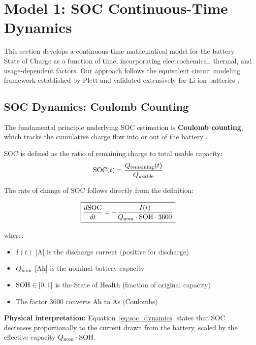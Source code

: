 \section{Model 1: SOC Continuous-Time Dynamics}
\label{sec:model1}

This section develops a continuous-time mathematical model for the battery State of Charge as a function of time, incorporating electrochemical, thermal, and usage-dependent factors. Our approach follows the equivalent circuit modeling framework established by Plett \cite{Plett2015} and validated extensively for Li-ion batteries \cite{Hu2012, Chen2006}.

\subsection{SOC Dynamics: Coulomb Counting}
\label{subsec:soc_dynamics}

The fundamental principle underlying SOC estimation is \textbf{Coulomb counting}, which tracks the cumulative charge flow into or out of the battery \cite{Plett2004}.

\begin{definition}
SOC is defined as the ratio of remaining charge to total usable capacity:
\begin{equation}
    \text{SOC}(t) = \frac{Q_{\text{remaining}}(t)}{Q_{\text{usable}}}
\end{equation}
\end{definition}

The rate of change of SOC follows directly from the definition:

\begin{equation}
    \boxed{\frac{d\text{SOC}}{dt} = -\frac{I(t)}{Q_{\text{nom}} \cdot \text{SOH} \cdot 3600}}
    \label{eq:soc_dynamics}
\end{equation}

where:
\begin{itemize}
    \item $I(t)$ [A] is the discharge current (positive for discharge)
    \item $Q_{\text{nom}}$ [Ah] is the nominal battery capacity
    \item $\text{SOH} \in [0,1]$ is the State of Health (fraction of original capacity)
    \item The factor 3600 converts Ah to As (Coulombs)
\end{itemize}

\textbf{Physical interpretation:} Equation~\eqref{eq:soc_dynamics} states that SOC decreases proportionally to the current drawn from the battery, scaled by the effective capacity $Q_{\text{nom}} \cdot \text{SOH}$.

